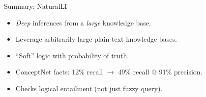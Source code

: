 \begin{frame}{Summary: NaturalLI}
\begin{itemize}
  \item \textit{Deep} inferences from a \textit{large} knowledge base.
  \item Leverage arbitrarily large plain-text knowledge bases.
  \item ``Soft'' logic with probability of truth.
\end{itemize}
\vspace{0.5cm}
\pause

\begin{itemize}
  \item ConceptNet facts: 12\% recall $\rightarrow$ 49\% recall @ 91\% precision.
  \item Checks logical entailment (not just fuzzy query).
\end{itemize}
\vspace{0.25cm}
\pause

\end{frame}
